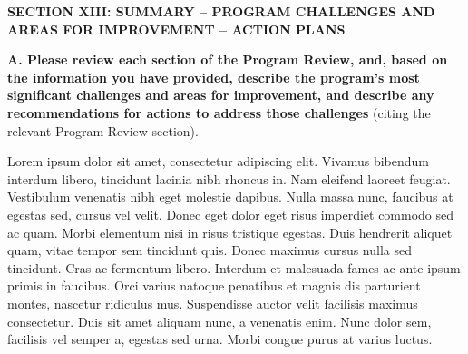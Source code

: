 \textbf{SECTION XIII: SUMMARY – PROGRAM CHALLENGES AND AREAS FOR IMPROVEMENT – ACTION PLANS}

\textbf{A. Please review each section of the Program Review, and, based on the information you have provided, describe the program’s most significant challenges and areas for improvement, and describe any recommendations for actions to address those challenges} (citing the relevant Program Review section).

Lorem ipsum dolor sit amet, consectetur adipiscing elit. Vivamus bibendum interdum libero, tincidunt lacinia nibh rhoncus in. Nam eleifend laoreet feugiat. Vestibulum venenatis nibh eget molestie dapibus. Nulla massa nunc, faucibus at egestas sed, cursus vel velit. Donec eget dolor eget risus imperdiet commodo sed ac quam. Morbi elementum nisi in risus tristique egestas. Duis hendrerit aliquet quam, vitae tempor sem tincidunt quis. Donec maximus cursus nulla sed tincidunt. Cras ac fermentum libero. Interdum et malesuada fames ac ante ipsum primis in faucibus. Orci varius natoque penatibus et magnis dis parturient montes, nascetur ridiculus mus. Suspendisse auctor velit facilisis maximus consectetur. Duis sit amet aliquam nunc, a venenatis enim. Nunc dolor sem, facilisis vel semper a, egestas sed urna. Morbi congue purus at varius luctus. 
